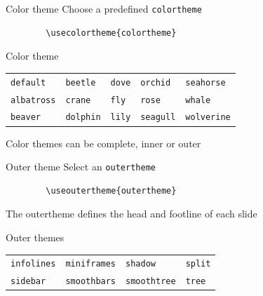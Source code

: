 \documentclass[xcolor=x11names, xcolor=table]{beamer}
\begin{document}
\begin{frame}[fragile]{Color theme}
    Choose a predefined \texttt{colortheme}
    \begin{verbatim}
        \usecolortheme{colortheme}
    \end{verbatim}

    \begin{block}{Color theme}
    \vspace{1em}
    \begin{tabular}{lllll}
        \texttt{default} & \cellcolor{DeepSkyBlue1}\texttt{beetle} &
        \cellcolor{DeepSkyBlue1}\texttt{dove}     & \cellcolor{magenta}\texttt{orchid} &
        \cellcolor{orange}\texttt{seahorse}\\
        \cellcolor{DeepSkyBlue1}\texttt{albatross}  &
        \cellcolor{DeepSkyBlue1}\texttt{crane}  &
        \cellcolor{DeepSkyBlue1}\texttt{fly} & \cellcolor{magenta}\texttt{rose}
        & \cellcolor{orange}\texttt{whale}\\
        \cellcolor{DeepSkyBlue1}\texttt{beaver}  &
        \cellcolor{orange}\texttt{dolphin}  & \cellcolor{magenta}\texttt{lily} & \cellcolor{DeepSkyBlue1}\texttt{seagull} & \cellcolor{DeepSkyBlue1}\texttt{wolverine}
    \end{tabular}

    \vspace{1em}
    Color themes can be {\color{DeepSkyBlue4} complete}, {\color{magenta} inner} or
    {\color{orange} outer}
    \end{block}
\end{frame}


\begin{frame}[fragile]{Outer theme}
    Select an \texttt{outertheme}

    \begin{verbatim}
        \useoutertheme{outertheme}
    \end{verbatim}

    The outertheme defines the head and footline of each slide

    \begin{block}{Outer themes}
    \vspace{1em}
    \begin{tabular}{llll}
    \texttt{infolines} & \texttt{miniframes} & \texttt{shadow} & \texttt{split}\\
    \texttt{sidebar} & \texttt{smoothbars} & \texttt{smoothtree} & \texttt{tree}
    \end{tabular}
    \end{block}
\end{frame}
\end{document}
